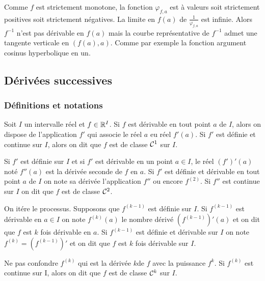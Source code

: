Comme $f$ est strictement monotone, la fonction $\varphi_{f,a}$ est à valeurs soit strictement positives soit strictement négatives. La limite en $f(a)$ de $\frac{1}{\varphi_{f,a}}$ est infinie. Alors $f^{-1}$ n'est pas dérivable en $f(a)$ mais la courbe représentative de $f^{-1}$ admet une tangente verticale en $(f(a),a)$. Comme par exemple la fonction argument cosinus hyperbolique en un.

\subsection{Dérivées successives}

\subsubsection{Définitions et notations}

Soit $I$ un intervalle réel et $f \in \mathbb{R}^I$. Si $f$ est dérivable en tout point $a$ de $I$, alors on dispose de l'application $f'$ qui associe le réel $a$ eu réel $f'(a)$. Si $f'$ est définie et continue sur $I$, alors on dit que $f$ est de classe $\mathcal{C}^{1}$ sur $I$.

Si $f'$ est définie sur $I$ et si $f'$ est dérivable en un point $a \in I$, le réel $(f')'(a)$ noté $f''(a)$ est la dérivée seconde de $f$ en $a$. Si $f'$ est définie et dérivable en tout point $a$ de $I$ on note sa dérivée l'application $f''$ ou encore $f^{(2)}$. Si $f''$ est continue sur $I$ on dit que $f$ est de classe $\mathcal{C}^{2}$.

On itére le processus. Supposons que $f^{(k-1)}$ est définie sur $I$. Si $f^{(k-1)}$ est dérivable en $a \in I$ on note $f^{(k)}(a)$ le nombre dérivé $(f^{(k-1)})'(a)$ et on dit que $f$ est $k$ fois dérivable en $a$. Si $f^{(k-1)}$ est définie et dérivable sur $I$ on note $f^{(k)} = (f^{(k-1)})'$ et on dit que $f$ est $k$ fois dérivable sur $I$.

Ne pas confondre $f^{(k)}$ qui est la dérivée $k$\ieme de $f$ avec la puissance $f^k$. Si $f^{(k)}$ est continue sur I, alors on dit que $f$ est de classe $\mathcal{C}^{k}$ sur $I$.

